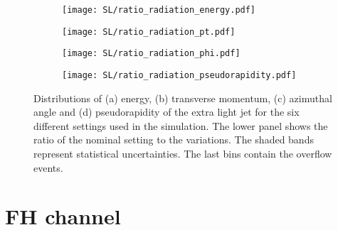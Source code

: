 \begin{figure}[H]
    \centering
    \begin{subfigure}{0.49\textwidth}
        \centering
        \texttt{[image: SL/ratio\_radiation\_energy.pdf]}
        \caption{}
        \label{app:subfig:E(radiation)_SL}
    \end{subfigure}
    \begin{subfigure}{0.49\textwidth}
        \centering
        \texttt{[image: SL/ratio\_radiation\_pt.pdf]}
        \caption{}
        \label{app:subfig:pt(radiation)_SL}
    \end{subfigure}

    \vspace{0.2cm}
    
    \begin{subfigure}{0.49\textwidth}
        \centering
        \texttt{[image: SL/ratio\_radiation\_phi.pdf]}
        \caption{}
        \label{app:subfig:phi(radiation)_SL}
    \end{subfigure}
    \begin{subfigure}{0.49\textwidth}
        \centering
        \texttt{[image: SL/ratio\_radiation\_pseudorapidity.pdf]}
        \caption{}
        \label{app:subfig:eta(radiation)_SL}
    \end{subfigure}
    \caption{Distributions of (a) energy, (b) transverse momentum,  (c) azimuthal angle and (d) pseudorapidity of the extra light jet for the six different settings used in the simulation. The lower panel shows the ratio of the nominal setting to the variations. The shaded bands represent statistical uncertainties. The last bins contain the overflow events.}
    \label{app:fig:radiation_SL}
\end{figure}









\section{\label{app:FH}FH channel}

